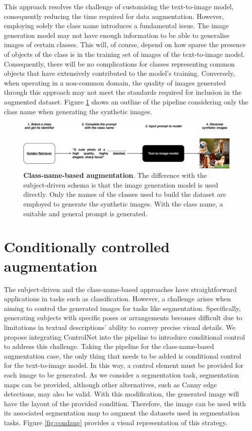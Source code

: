 This approach resolves the challenge of customising the text-to-image model, consequently reducing the time required for data augmentation. However, employing solely the class name introduces a fundamental issue. The image generation model may not have enough information to be able to generalise images of certain classes. This will, of course, depend on how sparse the presence of objects of the class is in the training set of images of the text-to-image model. Consequently, there will be no complications for classes representing common objects that have extensively contributed to the model's training. Conversely, when operating in a non-common domain, the quality of images generated through this approach may not meet the standards required for inclusion in the augmented dataset. Figure \ref{fig:classaug} shows an outline of the pipeline considering only the class name when generating the synthetic images.

\begin{figure}
    \centering
    \includegraphics[width=1\textwidth]{Pictures/class-name-augmentation.pdf}
    \caption{\textbf{Class-name-based augmentation}. The difference with the subject-driven schema is that the image generation model is used directly. Only the names of the classes used to build the dataset are employed to generate the synthetic images. With the class name, a suitable and general prompt is generated.}
    \label{fig:classaug}
\end{figure}


\section{Conditionally controlled augmentation} \label{sec: ccAugmentation}

The subject-driven and the class-name-based approaches have straightforward applications in tasks such as classification. However, a challenge arises when aiming to control the generated images for tasks like segmentation. Specifically, generating subjects with specific poses or arrangements becomes difficult due to limitations in textual descriptions' ability to convey precise visual details. We propose integrating ControlNet into the pipeline to introduce conditional control to address this challenge. Taking the pipeline for the class-name-based augmentation case, the only thing that needs to be added is conditional control for the text-to-image model. In this way, a control element must be provided for each image to be generated. As we consider a segmentation task, segmentation maps can be provided, although other alternatives, such as Canny edge detections, may also be valid. With this modification, the generated image will have the layout of the provided condition. Therefore, the image can be used with its associated segmentation map to augment the datasets used in segmentation tasks. Figure \ref{fig:condaug} provides a visual representation of this strategy.

